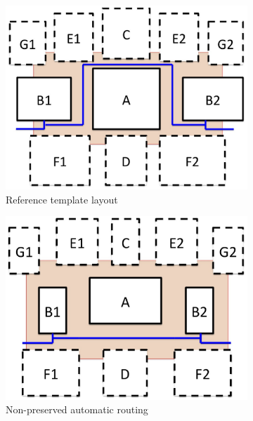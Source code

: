   \begin{figure}
    \centering
    \begin{subfigure}[t]{0.4\textwidth}
    \includegraphics[width=\textwidth]{Fig/RoutingPreserv_a.eps}
    \caption{Reference template layout}
    \label{fig:RoutingPreserv_A}
    \end{subfigure}
    \begin{subfigure}[t]{0.4\textwidth}
    \includegraphics[width=\textwidth]{Fig/RoutingPreserv_b.eps}
    \caption{Non-preserved automatic routing}
    \label{fig:RoutingPreserv_B}
    \end{subfigure}
    \begin{subfigure}[t]{0.4\textwidth}

\end{subfigure}
\end{figure}
